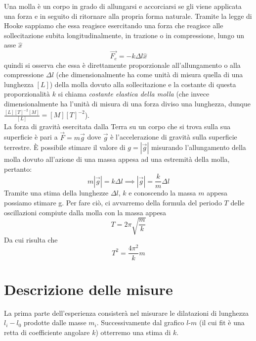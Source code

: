 \documentclass{article}
\begin{document}
    Una molla è un corpo in grado di allungarsi e accorciarsi se gli viene applicata una forza e in seguito di ritornare alla propria forma naturale. Tramite la legge di Hooke sappiamo che essa reagisce esercitando una forza che reagisce alle sollecitazione subita longitudinalmente, in trazione o in compressione, lungo un asse $\hat{x}$
    \begin{equation}
        \vec{F_e} = - k \Delta l \hat{x}
    \end{equation}
    quindi si osserva che essa è direttamente proporzionale all'allungamento o alla compressione $\Delta l$ (che dimensionalmente ha come unità di misura quella di una lunghezza $[L]$) della molla dovuto alla sollecitazione e la costante di questa proporzionalità $k$ si chiama \emph{costante elastica della molla} (che invece dimensionalmente ha l'unità di misura di una forza diviso una lunghezza, dunque $\frac{[L][T]^{-2}[M]}{[L]} = [M][T]^{-2}$). \\
    La forza di gravità esercitata dalla Terra su un corpo che si trova sulla sua superficie è pari a
    $\vec{F} = m\vec{g}$
    dove $\vec{g}$ è l'accelerazione di gravità sulla superficie terrestre. È possibile stimare il valore di $g=|\vec{g}|$ misurando l'allungamento della molla dovuto all'azione di una massa appesa ad una estremità della molla, pertanto:
    \begin{equation}
        m|\vec{g}| = k \Delta l \implies |\vec{g}| = \frac{k}{m} \Delta l
        \label{secondo_modello}
    \end{equation}
    Tramite una stima della lunghezze $\Delta l$, $k$ e conoscendo la massa $m$ appesa possiamo stimare g. Per fare ciò, ci avvarremo della formula del periodo $T$ delle oscillazioni compiute dalla molla con la massa appesa
    \begin{equation}
        T = 2 \pi \sqrt{\frac{m}{k}}
    \end{equation}
    Da cui risulta che 
    \begin{equation}
        T^2 = \frac{4\pi^2}{k} m
        \label{primo_modello}
    \end{equation}


    \section{Descrizione delle misure}
    La prima parte dell’esperienza consisterà nel misurare le dilatazioni di lunghezza $l_i - l_0$ prodotte dalle masse $m_i$. Successivamente dal grafico $l$-$m$ (il cui fit è una retta di coefficiente angolare $k$) otterremo una stima di $k$.
\end{document}
